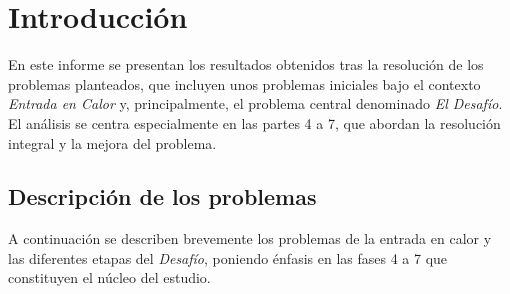 \documentclass[a4paper,12pt]{article}
\begin{document}
\thispagestyle{empty}
\clearpage

\tableofcontents
\clearpage

\section{Introducción}
En este informe se presentan los resultados obtenidos tras la resolución de los problemas planteados, que incluyen unos problemas iniciales bajo el contexto \textit{Entrada en Calor} y, principalmente, el problema central denominado \textit{El Desafío}. El análisis se centra especialmente en las partes 4 a 7, que abordan la resolución integral y la mejora del problema.

\subsection*{Descripción de los problemas}

A continuación se describen brevemente los problemas de la entrada en calor y las diferentes etapas del \textit{Desafío}, poniendo énfasis en las fases 4 a 7 que constituyen el núcleo del estudio.
\end{document}

